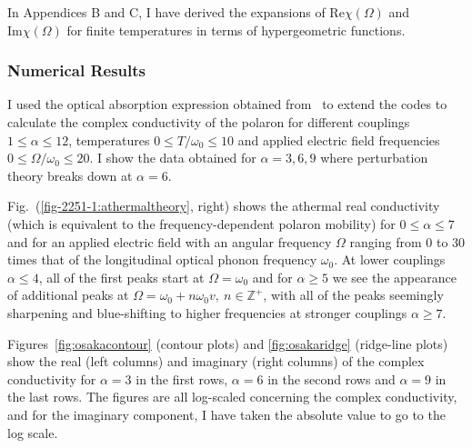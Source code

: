 In Appendices B and C, I have derived the expansions of $\text{Re}\chi(\Omega)$ and $\text{Im}\chi(\Omega)$ for finite temperatures in terms of hypergeometric functions.

\subsubsection{Numerical Results}

I used the optical absorption expression obtained from~\cite{devreese_optical_1972} to extend the codes to calculate the complex conductivity of the polaron for different couplings $1 \leq \alpha \leq 12$, temperatures $0 \leq T / \omega_0 \leq 10$ and applied electric field frequencies $0 \leq \Omega / \omega_0 \leq 20$. I show the data obtained for $\alpha = 3, 6, 9$ where perturbation theory breaks down at $\alpha = 6$. 

Fig.~(\ref{fig-2251-1:athermaltheory}, right) shows the athermal real conductivity (which is equivalent to the frequency-dependent polaron mobility) for $0 \leq \alpha \leq 7$ and for an applied electric field with an angular frequency $\Omega$ ranging from $0$ to $30$ times that of the longitudinal optical phonon frequency $\omega_0$. At lower couplings $\alpha \leq 4$, all of the first peaks start at $\Omega = \omega_0$ and for $\alpha \geq 5$ we see the appearance of additional peaks at $\Omega = \omega_0 + n \omega_0 v,\ n \in \mathbb{Z}^+$, with all of the peaks seemingly sharpening and blue-shifting to higher frequencies at stronger couplings $\alpha \geq 7$.

Figures~\ref{fig:osakacontour} (contour plots) and \ref{fig:osakaridge} (ridge-line plots) show the real (left columns) and imaginary (right columns) of the complex conductivity for $\alpha = 3$ in the first rows, $\alpha = 6$ in the second rows and $\alpha = 9$ in the last rows. The figures are all log-scaled concerning the complex conductivity, and for the imaginary component, I have taken the absolute value to go to the log scale.

